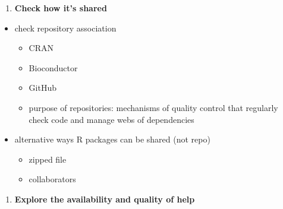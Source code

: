 \documentclass[10pt,letterpaper]{article}
\providecommand{\tightlist}{%
  \setlength{\itemsep}{0pt}\setlength{\parskip}{0pt}}
\begin{document}
\begin{enumerate}
\def\labelenumi{\arabic{enumi}.}
\setcounter{enumi}{2}
\tightlist
\item
  \textbf{Check how it's shared}
\end{enumerate}

\begin{itemize}
\tightlist
\item
  check repository association

  \begin{itemize}
  \tightlist
  \item
    CRAN
  \item
    Bioconductor
  \item
    GitHub
  \item
    purpose of repositories: mechanisms of quality control that
    regularly check code and manage webs of dependencies
  \end{itemize}
\item
  alternative ways R packages can be shared (not repo)

  \begin{itemize}
  \tightlist
  \item
    zipped file
  \item
    collaborators
  \end{itemize}
\end{itemize}

\begin{enumerate}
\def\labelenumi{\arabic{enumi}.}
\setcounter{enumi}{3}
\tightlist
\item
  \textbf{Explore the availability and quality of help}
\end{enumerate}
\end{document}
